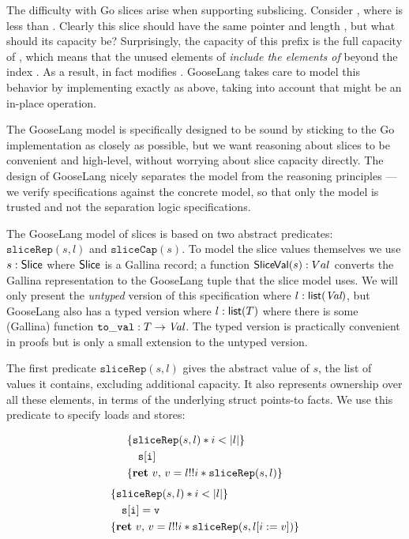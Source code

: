 The difficulty with Go slices arise when supporting subslicing. Consider
, where  is less than .
Clearly this slice should have the same pointer and length ,
but what should its capacity be? Surprisingly, the capacity of this
prefix is the full capacity of , which means that the unused
elements of  \emph{include the elements of }
beyond the index . As a result, 
in fact modifies . GooseLang takes care to model this
behavior by implementing  exactly as above, taking into
account that  might be an in-place operation.

The GooseLang model is specifically designed to be sound by sticking to
the Go implementation as closely as possible, but we want reasoning
about slices to be convenient and high-level, without worrying about
slice capacity directly. The design of GooseLang nicely separates the
model from the reasoning principles --- we verify specifications against
the concrete model, so that only the model is trusted and not the
separation logic specifications.

\newcommand{\sliceRep}{\mathtt{sliceRep}}
\newcommand{\sliceCap}{\mathtt{sliceCap}}

\newcommand{\lappend}{\mdoubleplus}

The GooseLang model of slices is based on two abstract predicates:
$\sliceRep(s, l)$ and $\sliceCap(s)$. To model the slice values
themselves we use $s : \textsf{\upshape Slice}$ where $\textsf{\upshape Slice}$ is a Gallina record; a
function $\textsf{\upshape SliceVal}(s) : Val$ converts the Gallina representation to
the GooseLang tuple that the slice model uses. We will only present the
\emph{untyped} version of this specification where $l : \textsf{\upshape list}(\textit{Val})$, but
GooseLang also has a typed version where $l : \textsf{\upshape list}(T)$ where there is
some (Gallina) function $\mathtt{to\_val} : T \to \textit{Val}$. The typed version is
practically convenient in proofs but is only a small extension to the
untyped version.

The first predicate $\sliceRep(s, l)$ gives the abstract value of
$s$, the list of values it contains, excluding additional capacity. It
also represents ownership over all these elements, in terms of the
underlying struct points-to facts. We use this predicate to specify
loads and stores:

\[
  \hoareV{\sliceRep(s, l) * i < |l|}%
{\mathtt{s[i]}}%
{\Ret{v} v = l !! i * \sliceRep(s, l)}
\]
\[
  \hoareV{\sliceRep(s, l) * i < |l|}%
 {\mathtt{s[i] = v}}%
{\Ret{v} v = l !! i * \sliceRep(s, l[i := v])}
\]

